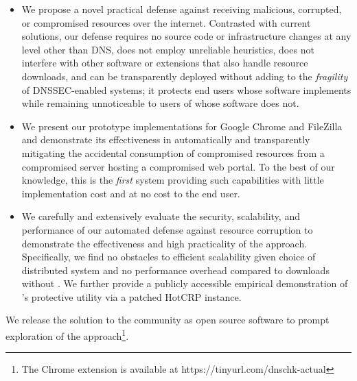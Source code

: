 \begin{itemize}

  \item We propose a novel practical defense against receiving malicious,
  corrupted, or compromised resources over the internet. Contrasted with current
  solutions, our defense requires no source code or infrastructure changes at
  any level other than DNS, does not employ unreliable heuristics, does not
  interfere with other software or extensions that also handle resource
  downloads, and can be transparently deployed without adding to the
  \textit{fragility} of DNSSEC-enabled systems; it protects end users whose
  software implements \SYSTEM{} while remaining unnoticeable to users of whose
  software does not.

  \item We present our prototype \SYSTEM{} implementations for Google Chrome and
  FileZilla and demonstrate its effectiveness in automatically and transparently
  mitigating the accidental consumption of compromised resources from a
  compromised server hosting a compromised web portal. To the best of our
  knowledge, this is the \emph{first} system providing such capabilities with
  little implementation cost and at no cost to the end user.

  \item We carefully and extensively evaluate the security, scalability, and
  performance of our automated defense against resource corruption to
  demonstrate the effectiveness and high practicality of the \SYSTEM{} approach.
  Specifically, we find no obstacles to efficient scalability given choice of
  distributed system and no performance overhead compared to downloads without
  \SYSTEM{}. We further provide a publicly accessible empirical demonstration of
  \SYSTEM{}'s protective utility via a patched HotCRP instance.

\end{itemize}

We release the \SYSTEM{} solution to the community as open source software to
prompt exploration of the \SYSTEM{} approach\footnote{The \SYSTEM{} Chrome
extension is available at https://tinyurl.com/dnschk-actual}.

